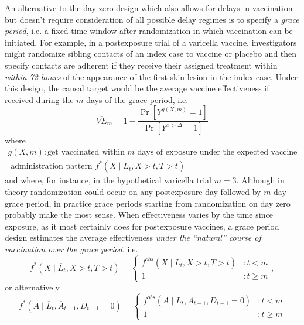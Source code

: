 \begin{appendices}
\begin{refsection}
    An alternative to the day zero design which also allows for delays in vaccination but doesn't require consideration of all possible delay regimes is to specify a \textit{grace period}, i.e. a fixed time window after randomization in which vaccination can be initiated. For example, in a postexposure trial of a varicella vaccine, investigators might randomize sibling contacts of an index case to vaccine or placebo and then specify contacts are adherent if they receive their assigned treatment within \textit{within 72 hours} of the appearance of the first skin lesion in the index case. Under this design, the causal target would be the average vaccine effectiveness if received during the $m$ days of the grace period, i.e.
    $$
    \overline{VE}_m = 1 - \frac{\Pr[Y^{g(X,m)} = 1]}{\Pr[Y^{x > \Delta} = 1]}
    $$ 
    where
    \begin{gather*}
        g(X,m): \text{get vaccinated within $m$ days of exposure under the expected vaccine } \\ \text{ administration pattern }  f^*(X \mid \overline{L}_t, X > t, T > t)
    \end{gather*}
    and where, for instance, in the hypothetical varicella trial $m = 3$. Although in theory randomization could occur on any postexposure day followed by $m$-day grace period, in practice grace periods starting from randomization on day zero probably make the most sense. When effectiveness varies by the time since exposure, as it most certainly does for postexposure vaccines, a grace period design estimates the average effectiveness \textit{under the ``natural'' course of vaccination over the grace period}, i.e.
     $$f^*(X \mid \overline{L}_t, X > t, T > t) = \begin{cases} 
        f^{obs}(X \mid \overline{L}_t, X > t, T > t) & : t < m\\
        1 & : t \geq m
     \end{cases},$$
    or alternatively
    $$f^*(A \mid \overline{L}_t, \overline{A}_{t-1}, D_{t-1} = 0) = \begin{cases} 
        f^{obs}(A \mid \overline{L}_t, \overline{A}_{t-1}, D_{t-1} = 0) & : t < m\\
        1 & : t \geq m
     \end{cases}$$

\end{refsection}
\end{appendices}
